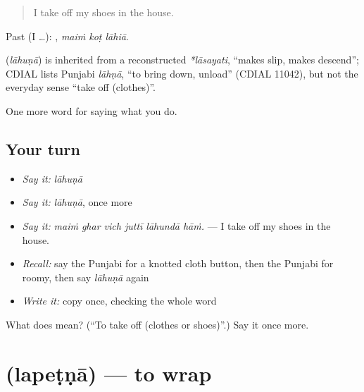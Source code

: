 \begin{quote}
I take off my shoes in the house.
\end{quote}

Past (I …):   , \emph{maiṁ koṭ lāhiā}.

\begin{cousinweb}
\textbf{} (\emph{lāhuṇā}) is inherited from a reconstructed \emph{*lāsayati}, \textquotedblleft{}makes slip, makes descend\textquotedblright{}; CDIAL lists Punjabi \emph{lāhṇā}, \textquotedblleft{}to bring down, unload\textquotedblright{} (CDIAL 11042), but not the everyday sense \textquotedblleft{}take off (clothes)\textquotedblright{}.
\end{cousinweb}

\begin{grammarlens}[title={What you've built}]
One more word for saying what you do.
\end{grammarlens}

\subsection*{Your turn}
\begin{itemize}
\raggedright
  \item \emph{Say it:} \emph{lāhuṇā}
  \item \emph{Say it:} \emph{lāhuṇā}, once more
  \item \emph{Say it:} \emph{maiṁ ghar vich juttī lāhundā hāṁ.} — I take off my shoes in the house.
  \item \emph{Recall:} say the Punjabi for a knotted cloth button, then the Punjabi for roomy, then say \emph{lāhuṇā} again
  \item \emph{Write it:} copy \textbf{} once, checking the whole word
\end{itemize}

\begin{tcolorbox}[breakable,colback=teal!4,colframe=teal!35!black,title={Before you move on}]
What does  mean? (\textquotedblleft{}To take off (clothes or shoes)\textquotedblright{}.) Say it once more.
\end{tcolorbox}
\section[\texorpdfstring{\pa{ਲਪੇਟਣਾ} (lapeṭṇā)}{ਲਪੇਟਣਾ (lapeṭṇā)}]{ (lapeṭṇā) — to wrap}

\label{lesson:PA-C230-lapetna}



